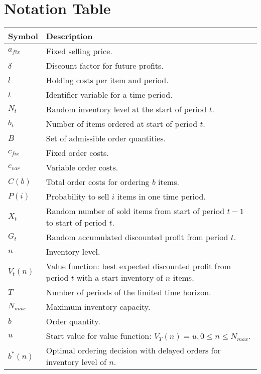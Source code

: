 \chapter{Notation Table}

\begin{longtable}{ll}
		\toprule
		\textbf{Symbol} & \textbf{Description} \\
		\midrule
		$a_{fix}$ & Fixed selling price. \\
		$\delta$ & Discount factor for future profits. \\
		$l$ & Holding costs per item and period. \\
		$t$ & Identifier variable for a time period. \\
		$N_t$ & Random inventory level at the start of period $t$. \\
		$b_t$ & Number of items ordered at start of period $t$. \\
		$B$ & Set of admissible order quantities. \\
		$c_{fix}$ & Fixed order costs. \\
		$c_{var}$ & Variable order costs. \\
		$C(b)$ & Total order costs for ordering $b$ items. \\
		$P(i)$ & Probability to sell $i$ items in one time period. \\
		$X_t$ & \makecell[l]{Random number of sold items from start of \\ period $t-1$ to start of period $t$.} \\
		$G_t$ & Random accumulated discounted profit from period $t$. \\
		$n$ & Inventory level. \\
		$V_t(n)$ & \makecell[l]{Value function: best expected discounted profit from \\ period $t$ with a start inventory of $n$ items.} \\
		$T$ & Number of periods of the limited time horizon. \\
		$N_{max}$ & Maximum inventory capacity. \\
		$b$ & Order quantity. \\
		$u$ & Start value for value function: $V_T(n) = u, 0 \leq n \leq N_{max}$. \\
		$b^*(n)$ & \makecell[l]{Optimal ordering decision with delayed orders \\ for inventory level of $n$.} \\

\end{longtable}
